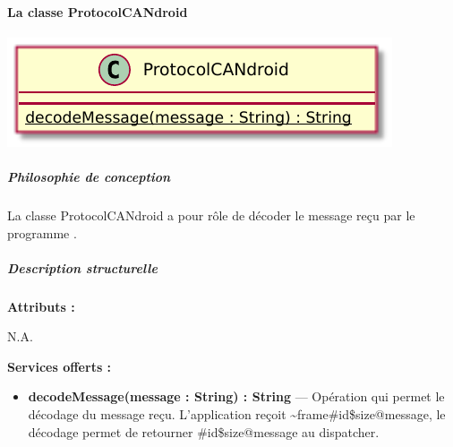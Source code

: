 \paragraph{La classe ProtocolCANdroid}


\begin{minipage}
    {\linewidth}
    \centering
    \includegraphics[width=0.50\linewidth]{../schemas/Conception_detaillee/classe_protocolCANdroid.pdf}
\end{minipage}
\subparagraph{Philosophie de conception \newline} 

\medspace

La classe ProtocolCANdroid a pour rôle de décoder le message reçu par le programme {\nomLogiciel}. 

\subparagraph{Description structurelle \newline}

\medspace

\textbf{Attributs :}

N.A.

\textbf{Services offerts :}

\begin{itemize}
    \item \textbf{decodeMessage(message : String) : String} --- Opération qui permet le décodage du message reçu. L'application {\nomApplication} reçoit \textasciitilde{}frame\#id\$size@message, le décodage permet de retourner \#id\$size@message au dispatcher. 
\end{itemize}


